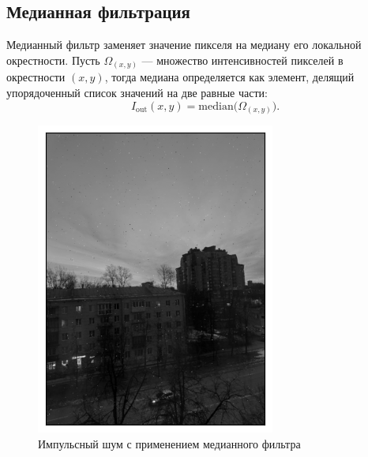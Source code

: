 \documentclass[a4paper,12pt]{article}
\begin{document}
\subsection{Медианная фильтрация}
Медианный фильтр заменяет значение пикселя на медиану его локальной окрестности. Пусть \(\Omega_{(x,y)}\) --- множество интенсивностей пикселей в окрестности \((x,y)\), тогда медиана определяется как элемент, делящий упорядоченный список значений на две равные части:
\[
I_{\text{out}}(x,y) = \mathrm{median}\bigl(\Omega_{(x,y)}\bigr).
\]
        \begin{figure}[H]
            \begin{minipage}{0.49\textwidth}
                \centering \includegraphics[width=\textwidth]{results/nlf_sap_1.png}
                \caption{Импульсный шум с применением медианного фильтра}
            \end{minipage}\hfill
            \begin{minipage}{0.49\textwidth}

\end{minipage}
\end{figure}
\end{document}
